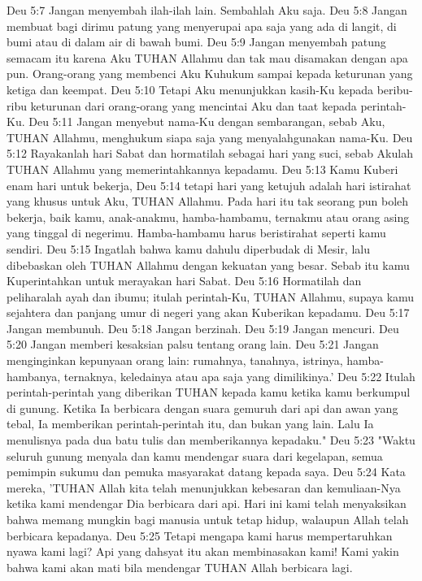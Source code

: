 Deu 5:7  Jangan menyembah ilah-ilah lain. Sembahlah Aku saja.
Deu 5:8  Jangan membuat bagi dirimu patung yang menyerupai apa saja yang ada di langit, di bumi atau di dalam air di bawah bumi.
Deu 5:9  Jangan menyembah patung semacam itu karena Aku TUHAN Allahmu dan tak mau disamakan dengan apa pun. Orang-orang yang membenci Aku Kuhukum sampai kepada keturunan yang ketiga dan keempat.
Deu 5:10  Tetapi Aku menunjukkan kasih-Ku kepada beribu-ribu keturunan dari orang-orang yang mencintai Aku dan taat kepada perintah-Ku.
Deu 5:11  Jangan menyebut nama-Ku dengan sembarangan, sebab Aku, TUHAN Allahmu, menghukum siapa saja yang menyalahgunakan nama-Ku.
Deu 5:12  Rayakanlah hari Sabat dan hormatilah sebagai hari yang suci, sebab Akulah TUHAN Allahmu yang memerintahkannya kepadamu.
Deu 5:13  Kamu Kuberi enam hari untuk bekerja,
Deu 5:14  tetapi hari yang ketujuh adalah hari istirahat yang khusus untuk Aku, TUHAN Allahmu. Pada hari itu tak seorang pun boleh bekerja, baik kamu, anak-anakmu, hamba-hambamu, ternakmu atau orang asing yang tinggal di negerimu. Hamba-hambamu harus beristirahat seperti kamu sendiri.
Deu 5:15  Ingatlah bahwa kamu dahulu diperbudak di Mesir, lalu dibebaskan oleh TUHAN Allahmu dengan kekuatan yang besar. Sebab itu kamu Kuperintahkan untuk merayakan hari Sabat.
Deu 5:16  Hormatilah dan peliharalah ayah dan ibumu; itulah perintah-Ku, TUHAN Allahmu, supaya kamu sejahtera dan panjang umur di negeri yang akan Kuberikan kepadamu.
Deu 5:17  Jangan membunuh.
Deu 5:18  Jangan berzinah.
Deu 5:19  Jangan mencuri.
Deu 5:20  Jangan memberi kesaksian palsu tentang orang lain.
Deu 5:21  Jangan menginginkan kepunyaan orang lain: rumahnya, tanahnya, istrinya, hamba-hambanya, ternaknya, keledainya atau apa saja yang dimilikinya.'
Deu 5:22  Itulah perintah-perintah yang diberikan TUHAN kepada kamu ketika kamu berkumpul di gunung. Ketika Ia berbicara dengan suara gemuruh dari api dan awan yang tebal, Ia memberikan perintah-perintah itu, dan bukan yang lain. Lalu Ia menulisnya pada dua batu tulis dan memberikannya kepadaku."
Deu 5:23  "Waktu seluruh gunung menyala dan kamu mendengar suara dari kegelapan, semua pemimpin sukumu dan pemuka masyarakat datang kepada saya.
Deu 5:24  Kata mereka, 'TUHAN Allah kita telah menunjukkan kebesaran dan kemuliaan-Nya ketika kami mendengar Dia berbicara dari api. Hari ini kami telah menyaksikan bahwa memang mungkin bagi manusia untuk tetap hidup, walaupun Allah telah berbicara kepadanya.
Deu 5:25  Tetapi mengapa kami harus mempertaruhkan nyawa kami lagi? Api yang dahsyat itu akan membinasakan kami! Kami yakin bahwa kami akan mati bila mendengar TUHAN Allah berbicara lagi.
